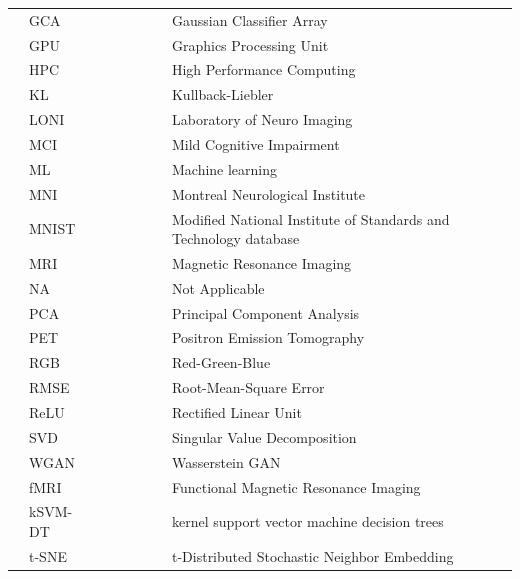 \documentclass[11pt, fleqn, titlepage]{article}
\newcommand{\1}[1]{\mathds{1}\left[#1\right]}
\begin{document}
\begin{table}[H]
\begin{tabular}{l l l l l l l l l}
		& GCA           & & & & & & Gaussian Classifier Array                                         & \\
		& GPU           & & & & & & Graphics Processing Unit                                          & \\
		& HPC           & & & & & & High Performance Computing                                        & \\
		& KL            & & & & & & Kullback-Liebler                                                  & \\
		& LONI          & & & & & & Laboratory of Neuro Imaging                                       & \\
		& MCI           & & & & & & Mild Cognitive Impairment                                         & \\
		& ML            & & & & & & Machine learning                                                  & \\
		& MNI           & & & & & & Montreal Neurological Institute                                   & \\
		& MNIST         & & & & & & Modified National Institute of Standards and Technology database  & \\
		& MRI           & & & & & & Magnetic Resonance Imaging                                        & \\
		& NA            & & & & & & Not Applicable                                                    & \\
		& PCA           & & & & & & Principal Component Analysis                                      & \\
		& PET           & & & & & & Positron Emission Tomography                                      & \\
		& RGB           & & & & & & Red-Green-Blue                                                    & \\
		& RMSE          & & & & & & Root-Mean-Square Error                                            & \\
		& ReLU          & & & & & & Rectified Linear Unit                                             & \\
		& SVD           & & & & & & Singular Value Decomposition                                      & \\
		& WGAN          & & & & & & Wasserstein GAN                                                   & \\
		& fMRI          & & & & & & Functional Magnetic Resonance Imaging                             & \\
		& kSVM-DT       & & & & & & kernel support vector machine decision trees                      & \\
		& t-SNE         & & & & & & t-Distributed Stochastic Neighbor Embedding                       & \\
		
		
		
		\bottomrule
	\end{tabular}
\end{table}
\end{document}
